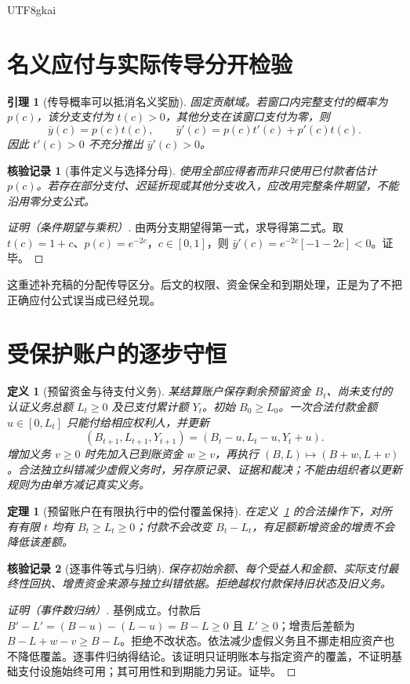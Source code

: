 \documentclass[12pt,a4paper,openany]{report}
\newtheorem{definition}{定义}[chapter]
\newtheorem{theorem}{定理}[chapter]
\newtheorem{lemma}{引理}[chapter]
\newtheorem{Certificate}{核验记录}[chapter]
\begin{document}
\begin{CJK*}{UTF8}{gkai}
\section{名义应付与实际传导分开检验}
\begin{lemma}[传导概率可以抵消名义奖励]
\label{lem:transmission}
固定贡献域。若窗口内完整支付的概率为 $p(c)$，该分支支付为 $t(c)>0$，其他分支在该窗口支付为零，则
\[
 \bar y(c)=p(c)t(c),\qquad
 \bar y'(c)=p(c)t'(c)+p'(c)t(c).
\]
因此 $t'(c)>0$ 不充分推出 $\bar y'(c)>0$。
\end{lemma}
\begin{Certificate}[事件定义与选择分母]
使用全部应得者而非只使用已付款者估计 $p(c)$。若存在部分支付、迟延折现或其他分支收入，应改用完整条件期望，不能沿用零分支公式。
\end{Certificate}
\begin{proof}[证明（条件期望与乘积）]
由两分支期望得第一式，求导得第二式。取 $t(c)=1+c$、$p(c)=e^{-2c}$，$c\in[0,1]$，则 $\bar y'(c)=e^{-2c}[-1-2c]<0$。证毕。
\end{proof}
这重述补充稿的分配传导区分\cite{SourceSupplement}。后文的权限、资金保全和到期处理，正是为了不把正确应付公式误当成已经兑现。

\section{受保护账户的逐步守恒}
\begin{definition}[预留资金与待支付义务]
\label{def:ledger}
某结算账户保存剩余预留资金 $B_t$、尚未支付的认证义务总额 $L_t\ge0$ 及已支付累计额 $Y_t$。初始 $B_0\ge L_0$。一次合法付款金额 $u\in[0,L_t]$ 只能付给相应权利人，并更新
\[
 (B_{t+1},L_{t+1},Y_{t+1})=(B_t-u,L_t-u,Y_t+u).
\]
增加义务 $v\ge0$ 时先加入已到账资金 $w\ge v$，再执行 $(B,L)\mapsto(B+w,L+v)$。合法独立纠错减少虚假义务时，另存原记录、证据和裁决；不能由组织者以更新规则为由单方减记真实义务。
\end{definition}

\begin{theorem}[预留账户在有限执行中的偿付覆盖保持]
\label{thm:ledger}
在定义~\ref{def:ledger} 的合法操作下，对所有有限 $t$ 均有 $B_t\ge L_t\ge0$；付款不会改变 $B_t-L_t$，有足额新增资金的增责不会降低该差额。
\end{theorem}
\begin{Certificate}[逐事件等式与归纳]
保存初始余额、每个受益人和金额、实际支付最终性回执、增责资金来源与独立纠错依据。拒绝越权付款保持旧状态及旧义务。
\end{Certificate}
\begin{proof}[证明（事件数归纳）]
基例成立。付款后 $B'-L'=(B-u)-(L-u)=B-L\ge0$ 且 $L'\ge0$；增责后差额为 $B-L+w-v\ge B-L$。拒绝不改状态。依法减少虚假义务且不挪走相应资产也不降低覆盖。逐事件归纳得结论。该证明只证明账本与指定资产的覆盖，不证明基础支付设施始终可用；其可用性和到期能力另证。证毕。
\end{proof}

\end{CJK*}
\end{document}
